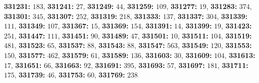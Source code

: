 \textsf{\bfseries 331231:} $183$, \textsf{\bfseries 331241:} $27$, \textsf{\bfseries 331249:} $44$, \textsf{\bfseries 331259:} $109$, \textsf{\bfseries 331277:} $19$, \textsf{\bfseries 331283:} $374$, \textsf{\bfseries 331301:} $345$, \textsf{\bfseries 331307:} $252$, \textsf{\bfseries 331319:} $218$, \textsf{\bfseries 331333:} $137$, \textsf{\bfseries 331337:} $304$, \textsf{\bfseries 331339:} $111$, \textsf{\bfseries 331349:} $107$, \textsf{\bfseries 331367:} $15$, \textsf{\bfseries 331369:} $154$, \textsf{\bfseries 331391:} $14$, \textsf{\bfseries 331399:} $19$, \textsf{\bfseries 331423:} $251$, \textsf{\bfseries 331447:} $111$, \textsf{\bfseries 331451:} $90$, \textsf{\bfseries 331489:} $47$, \textsf{\bfseries 331501:} $10$, \textsf{\bfseries 331511:} $104$, \textsf{\bfseries 331519:} $481$, \textsf{\bfseries 331523:} $65$, \textsf{\bfseries 331537:} $88$, \textsf{\bfseries 331543:} $88$, \textsf{\bfseries 331547:} $563$, \textsf{\bfseries 331549:} $120$, \textsf{\bfseries 331553:} $150$, \textsf{\bfseries 331577:} $462$, \textsf{\bfseries 331579:} $61$, \textsf{\bfseries 331589:} $136$, \textsf{\bfseries 331603:} $30$, \textsf{\bfseries 331609:} $104$, \textsf{\bfseries 331613:} $17$, \textsf{\bfseries 331651:} $66$, \textsf{\bfseries 331663:} $92$, \textsf{\bfseries 331691:} $395$, \textsf{\bfseries 331693:} $57$, \textsf{\bfseries 331697:} $181$, \textsf{\bfseries 331711:} $175$, \textsf{\bfseries 331739:} $46$, \textsf{\bfseries 331753:} $60$, \textsf{\bfseries 331769:} $238$